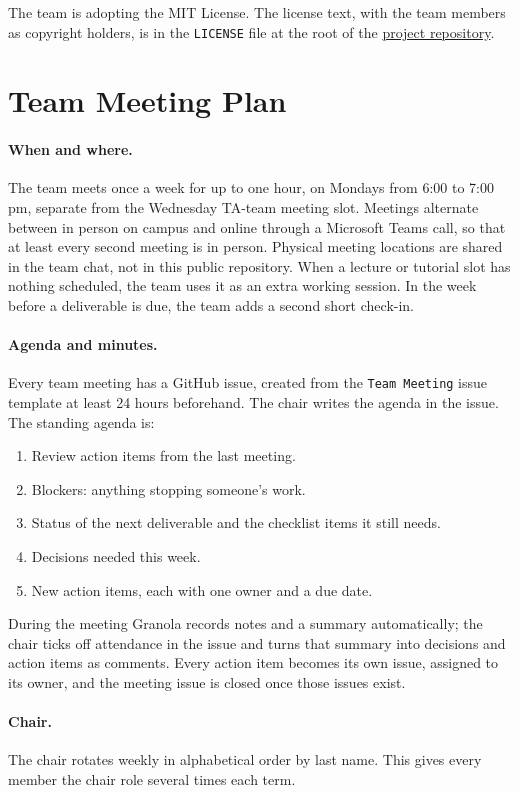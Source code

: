 \documentclass{article}
\begin{document}
The team is adopting the MIT License. The license text, with the team
members as copyright holders, is in the \texttt{LICENSE} file at the root
of the \href{https://github.com/jjustin-k/Tandem}{project repository}.

\section{Team Meeting Plan}

\paragraph{When and where.} The team meets once a week for up to one hour,
on Mondays from 6:00 to 7:00 pm, separate from the Wednesday TA-team
meeting slot. Meetings alternate between in person on campus
and online through a Microsoft Teams call, so that at least every second
meeting is in person. Physical meeting locations are shared in the team
chat, not in this public repository. When a lecture or tutorial slot has
nothing scheduled, the team uses it as an extra working session. In the
week before a deliverable is due, the team adds a second short check-in.

\paragraph{Agenda and minutes.} Every team meeting has a GitHub issue,
created from the \texttt{Team Meeting} issue template at least 24 hours
beforehand. The chair writes the agenda in the issue. The standing agenda
is:
\begin{enumerate}[noitemsep]
  \item Review action items from the last meeting.
  \item Blockers: anything stopping someone's work.
  \item Status of the next deliverable and the checklist items it still
  needs.
  \item Decisions needed this week.
  \item New action items, each with one owner and a due date.
\end{enumerate}
During the meeting Granola records notes and a summary automatically; the
chair ticks off attendance in the issue and turns that summary into
decisions and action items as comments. Every action item becomes its own
issue, assigned to its owner, and the meeting issue is closed once those
issues exist.

\paragraph{Chair.} The chair rotates weekly in alphabetical order by last
name. This gives every member the chair role several times each term.
\end{document}
